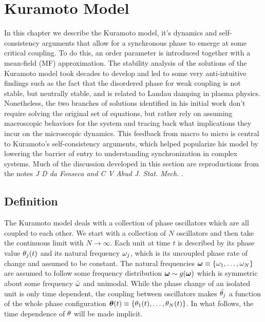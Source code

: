\chapter{Kuramoto Model}


In this chapter we describe the Kuramoto model, it's dynamics and self-consistency arguments that allow for a synchronous phase to
emerge at some critical coupling. To do this, an order parameter is introduced together with a mean-field (MF) approximation. The
stability analysis of the solutions of the Kuramoto model took decades to develop and led to some very anti-intuitive findings such as
the fact that the disordered phase for weak coupling is not stable, but neutrally stable, and is related to Landau damping in plasma
physics.  Nonetheless, the two branches of solutions identified in his initial work don't require solving the original set of
equations, but rather rely on assuming macroscopic behaviors for the system and tracing back what implications they incur on the
microscopic dynamics.  This feedback from macro to micro is central to Kuramoto's self-consistency arguments, which helped popularize
his model by lowering the barrier of entry to understanding synchronization in complex systems. Much of the discussion developed in
this section are reproductions from the notes \textit{J D da Fonseca and C V Abud J. Stat. Mech.} \cite{da_Fonseca_2018}.


\section{Definition}

The Kuramoto model deals with a collection of phase oscillators which are all coupled to each other. We start with a collection of $N$
oscillators and then take the continuous limit with $N \to \infty$. Each unit at time $t$ is described by its phase value $\theta_j(t)$
and its natural frequency $\omega_j$, which is its uncoupled phase rate of change and assumed to be constant. The natural frequencies
$\bm{\omega}\equiv \{\omega_1,\dots,\omega_N\}$ are assumed to follow some frequency distribution $\bm{\omega} \sim g(\bm{\omega})$
which is symmetric about some frequency $\bar{\omega}$ and unimodal. While the phase change of an isolated unit is only time dependent,
the coupling between oscillators makes $\dot{\theta_j}$ a function of the whole phase configuration $\bm{\theta}(t) \equiv \{
\theta_1(t), \dots, \theta_N(t)\}$. In what follows, the time dependence of $\theta$ will be made implicit.

